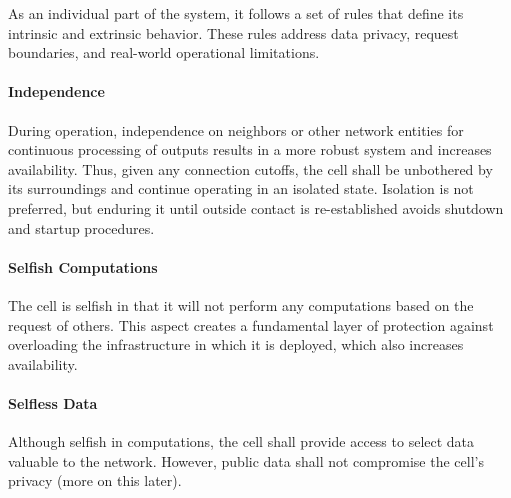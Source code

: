 
As an individual part of the system, it follows a set of rules that define its intrinsic and extrinsic behavior. These rules address data privacy, request boundaries, and real-world operational limitations.

\paragraph*{Independence} During operation, independence on neighbors or other network entities for continuous processing of outputs results in a more robust system and increases availability. Thus, given any connection cutoffs, the cell shall be unbothered by its surroundings and continue operating in an isolated state. Isolation is not preferred, but enduring it until outside contact is re-established avoids shutdown and startup procedures. 

\paragraph*{Selfish Computations} The cell is selfish in that it will not perform any computations based on the request of others. This aspect creates a fundamental layer of protection against overloading the infrastructure in which it is deployed, which also increases availability.

\paragraph*{Selfless Data} Although selfish in computations, the cell shall provide access to select data valuable to the network. However, public data shall not compromise the cell's privacy (more on this later).


